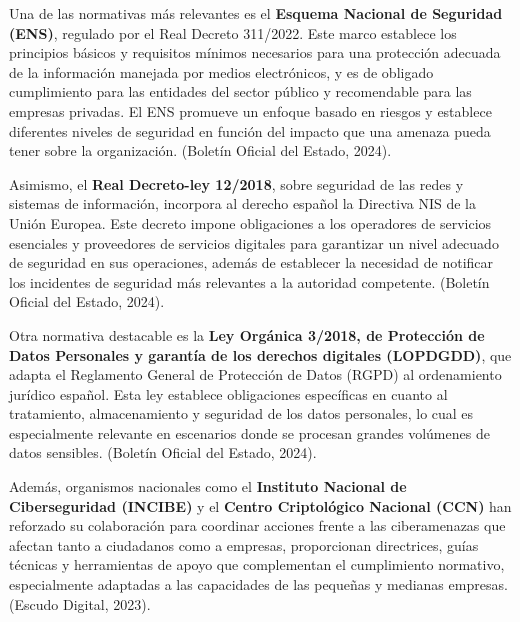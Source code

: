 \documentclass[a4paper, 10pt]{article}
\begin{document}
    Una de las normativas más relevantes es el \textbf{Esquema Nacional de Seguridad (ENS)}, regulado por el Real Decreto 311/2022. Este marco establece los principios básicos y requisitos mínimos necesarios para una protección adecuada de la información manejada por medios electrónicos, y es de obligado cumplimiento para las entidades del sector público y recomendable para las empresas privadas. El ENS promueve un enfoque basado en riesgos y establece diferentes niveles de seguridad en función del impacto que una amenaza pueda tener sobre la organización. (Boletín Oficial del Estado, 2024). \cite{boe}
    \par\vspace{0.5cm}

    Asimismo, el \textbf{Real Decreto-ley 12/2018}, sobre seguridad de las redes y sistemas de información, incorpora al derecho español la Directiva NIS de la Unión Europea. Este decreto impone obligaciones a los operadores de servicios esenciales y proveedores de servicios digitales para garantizar un nivel adecuado de seguridad en sus operaciones, además de establecer la necesidad de notificar los incidentes de seguridad más relevantes a la autoridad competente. (Boletín Oficial del Estado, 2024). \cite{boe}
    \par\vspace{0.5cm}

    Otra normativa destacable es la \textbf{Ley Orgánica 3/2018, de Protección de Datos Personales y garantía de los derechos digitales (LOPDGDD)}, que adapta el Reglamento General de Protección de Datos (RGPD) al ordenamiento jurídico español. Esta ley establece obligaciones específicas en cuanto al tratamiento, almacenamiento y seguridad de los datos personales, lo cual es especialmente relevante en escenarios donde se procesan grandes volúmenes de datos sensibles. (Boletín Oficial del Estado, 2024). \cite{boe}
    \par\vspace{0.5cm}

    Además, organismos nacionales como el \textbf{Instituto Nacional de Ciberseguridad (INCIBE)} y el \textbf{Centro Criptológico Nacional (CCN)}  han reforzado su colaboración para coordinar acciones frente a las ciberamenazas que afectan tanto a ciudadanos como a empresas, 
    proporcionan directrices, guías técnicas y herramientas de apoyo que complementan el cumplimiento normativo, 
    especialmente adaptadas a las capacidades de las pequeñas y medianas empresas. (Escudo Digital, 2023). \cite{escudo2023}
\end{document}
